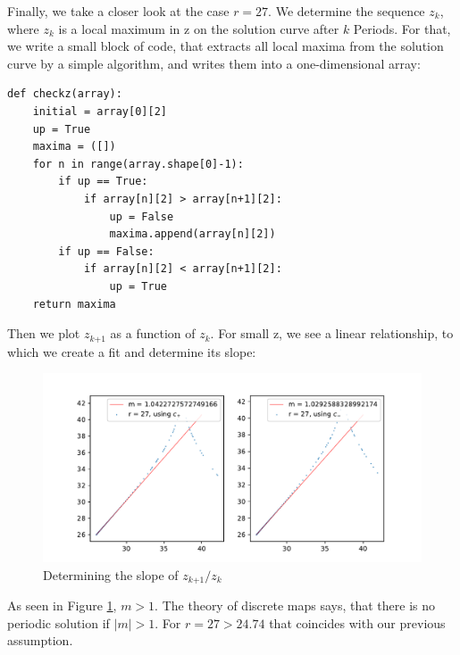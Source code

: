 \documentclass{article}
\begin{document}
Finally, we take a closer look at the case \( r = 27 \). We determine the
sequence \( z_k \), where \( z_k \) is a local maximum in z on the solution
curve after \( k \) Periods. For that, we write a small block of code, that
extracts all local maxima from the solution curve by a simple algorithm, and
writes them into a one-dimensional array:
\begin{lstlisting}
def checkz(array):
    initial = array[0][2]
    up = True
    maxima = ([])
    for n in range(array.shape[0]-1):
        if up == True:
            if array[n][2] > array[n+1][2]:
                up = False
                maxima.append(array[n][2])
        if up == False:
            if array[n][2] < array[n+1][2]:
                up = True
    return maxima
\end{lstlisting}
Then we plot \( z_{k \text{+1}} \) as a function of \( z_k \).
For small z, we see a linear relationship, to which we create a fit and determine
its slope:
\begin{figure}[H]
    \centering
    \includegraphics[width=\textwidth]{Figure2-2.pdf} 
    \caption{Determining the slope of $z_{k\text{+1}}/z_k$}
    \label{2-2}
\end{figure}
As seen in Figure \ref{2-2}, \( m > 1 \). The theory of discrete maps says,
that there is no periodic solution if \( |m| > 1 \). For \( r = 27 > 24.74 \)
that coincides with our previous assumption.
\end{document}
